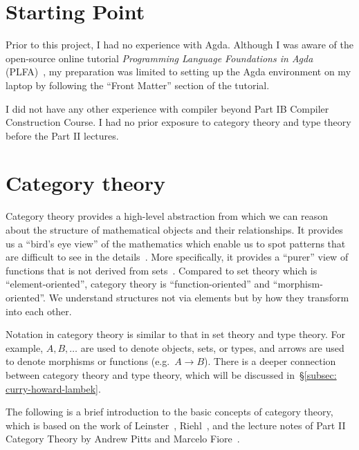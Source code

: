 \documentclass[12pt,a4paper]{report}
\theoremstyle{definition}
\newcommand{\secref}[1]{\S\ref{#1}}
\begin{document}
    \section{Starting Point}
    Prior to this project, I had no experience with Agda. Although I was aware of the open-source online tutorial \textit{Programming Language Foundations in Agda} (PLFA)~\autocite{plfa}, my preparation was limited to setting up the Agda environment on my laptop by following the ``Front Matter'' section of the tutorial.

    I did not have any other experience with compiler beyond Part IB Compiler Construction Course. I had no prior exposure to category theory and type theory before the Part II lectures.


    \section{Category theory} \label{sec: cat}
        Category theory provides a high-level abstraction from which we can reason about the structure of mathematical objects and their relationships. It provides us a ``bird's eye view'' of the mathematics which enable us to spot patterns that are difficult to see in the details~\autocite{basic_cat}. More specifically, it provides a ``purer'' view of functions that is not derived from sets~\autocite{scott-lambda}. Compared to set theory which is ``element-oriented'', category theory is ``function-oriented'' and ``morphism-oriented''. We understand structures not via elements but by how they transform into each other. 

        Notation in category theory is similar to that in set theory and type theory. For example, $A, B, \dots$ are used to denote objects, sets, or types, and arrows are used to denote morphisms or functions (e.g.\ $A \to B$). There is a deeper connection between category theory and type theory, which will be discussed in~\secref{subsec: curry-howard-lambek}. 

        The following is a brief introduction to the basic concepts of category theory, which is based on the work of Leinster~\autocite{basic_cat}, 
        Riehl~\autocite{cat_context}, and the lecture notes of Part II Category Theory by Andrew Pitts and Marcelo Fiore~\autocite{cat_lecture_notes}.
\end{document}
